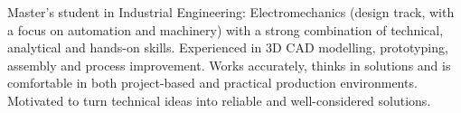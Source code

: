 \par{
    Master's student in Industrial Engineering: Electromechanics (design track, with a focus on automation and machinery) with a strong combination of technical, analytical and hands-on skills. Experienced in 3D CAD modelling, prototyping, assembly and process improvement. Works accurately, thinks in solutions and is comfortable in both project-based and practical production environments. Motivated to turn technical ideas into reliable and well-considered solutions.
}
